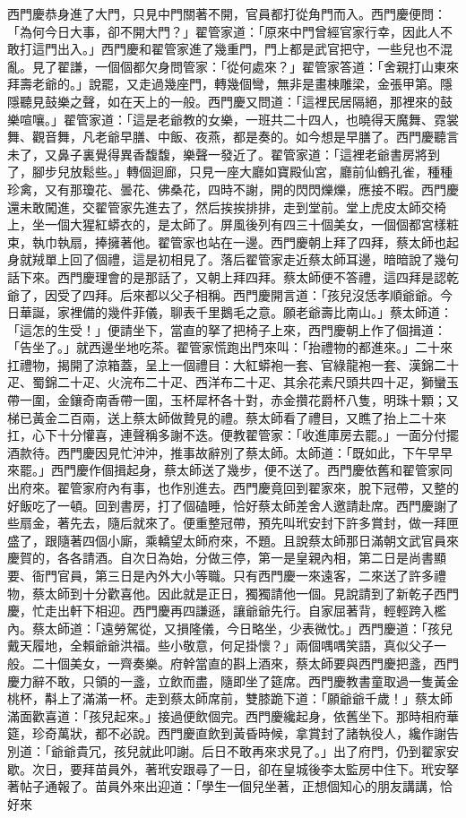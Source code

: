 \begin{showcontents}{}
西門慶恭身進了大門，只見中門關著不開，官員都打從角門而入。西門慶便問：「為何今日大事，卻不開大門？」翟管家道：「原來中門曾經官家行幸，因此人不敢打這門出入。」西門慶和翟管家進了幾重門，門上都是武官把守，一些兒也不混亂。見了翟謙，一個個都欠身問管家：「從何處來？」翟管家答道：「舍親打山東來拜壽老爺的。」說罷，又走過幾座門，轉幾個彎，無非是畫棟雕梁，金張甲第。隱隱聽見鼓樂之聲，如在天上的一般。西門慶又問道：「這裡民居隔絕，那裡來的鼓樂喧嚷。」翟管家道：「這是老爺教的女樂，一班共二十四人，也曉得天魔舞、霓裳舞、觀音舞，凡老爺早膳、中飯、夜燕，都是奏的。如今想是早膳了。西門慶聽言未了，又鼻子裏覺得異香馥馥，樂聲一發近了。翟管家道：「這裡老爺書房將到了，腳步兒放鬆些。」轉個迴廊，只見一座大廳如寶殿仙宮，廳前仙鶴孔雀，種種珍禽，又有那瓊花、曇花、佛桑花，四時不謝，開的閃閃爍爍，應接不暇。西門慶還未敢闖進，交翟管家先進去了，然后挨挨排排，走到堂前。堂上虎皮太師交椅上，坐一個大猩紅蟒衣的，是太師了。屏風後列有四三十個美女，一個個都宮樣粧束，執巾執扇，捧擁著他。翟管家也站在一邊。西門慶朝上拜了四拜，蔡太師也起身就羢單上回了個禮，這是初相見了。落后翟管家走近蔡太師耳邊，暗暗說了幾句話下來。西門慶理會的是那話了，又朝上拜四拜。蔡太師便不答禮，這四拜是認乾爺了，因受了四拜。后來都以父子相稱。西門慶開言道：「孩兒沒恁孝順爺爺。今日華誕，家裡備的幾件菲儀，聊表千里鵝毛之意。願老爺壽比南山。」蔡太師道：「這怎的生受！」便請坐下，當直的拏了把椅子上來，西門慶朝上作了個揖道：「告坐了。」就西邊坐地吃茶。翟管家慌跑出門來叫：「抬禮物的都進來。」二十來扛禮物，揭開了涼箱蓋，呈上一個禮目：大紅蟒袍一套、官綠龍袍一套、漢錦二十疋、蜀錦二十疋、火浣布二十疋、西洋布二十疋、其余花素尺頭共四十疋，獅蠻玉帶一圍，金鑲奇南香帶一圍，玉杯犀杯各十對，赤金攢花爵杯八隻，明珠十顆；又梯已黃金二百兩，送上蔡太師做贄見的禮。蔡太師看了禮目，又瞧了抬上二十來扛，心下十分懽喜，連聲稱多謝不迭。便教翟管家：「收進庫房去罷。」一面分付擺酒款待。西門慶因見忙沖沖，推事故辭別了蔡太師。太師道：「既如此，下午早早來罷。」西門慶作個揖起身，蔡太師送了幾步，便不送了。西門慶依舊和翟管家同出府來。翟管家府內有事，也作別進去。西門慶竟回到翟家來，脫下冠帶，又整的好飯吃了一頓。回到書房，打了個磕睡，恰好蔡太師差舍人邀請赴席。西門慶謝了些扇金，著先去，隨后就來了。便重整冠帶，預先叫玳安封下許多賞封，做一拜匣盛了，跟隨著四個小廝，乘轎望太師府來，不題。且說蔡太師那日滿朝文武官員來慶賀的，各各請酒。自次日為始，分做三停，第一是皇親內相，第二日是尚書顯要、衙門官員，第三日是內外大小等職。只有西門慶一來遠客，二來送了許多禮物，蔡太師到十分歡喜他。因此就是正日，獨獨請他一個。見說請到了新乾子西門慶，忙走出軒下相迎。西門慶再四謙遜，讓爺爺先行。自家屈著背，輕輕跨入檻內。蔡太師道：「遠勞駕從，又損隆儀，今日略坐，少表微忱。」西門慶道：「孩兒戴天履地，全賴爺爺洪福。些小敬意，何足掛懷？」兩個喁喁笑語，真似父子一般。二十個美女，一齊奏樂。府幹當直的斟上酒來，蔡太師要與西門慶把盞，西門慶力辭不敢，只領的一盞，立飲而盡，隨即坐了筵席。西門慶教書童取過一隻黃金桃杯，斠上了滿滿一杯。走到蔡太師席前，雙膝跪下道：「願爺爺千歲！」蔡太師滿面歡喜道：「孩兒起來。」接過便飲個完。西門慶纔起身，依舊坐下。那時相府華筵，珍奇萬狀，都不必說。西門慶直飲到黃昏時候，拿賞封了諸執役人，纔作謝告別道：「爺爺貴冗，孩兒就此叩謝。后日不敢再來求見了。」出了府門，仍到翟家安歇。次日，要拜苗員外，著玳安跟尋了一日，卻在皇城後李太監房中住下。玳安拏著帖子通報了。苗員外來出迎道：「學生一個兒坐著，正想個知心的朋友講講，恰好來
\end{showcontents}
